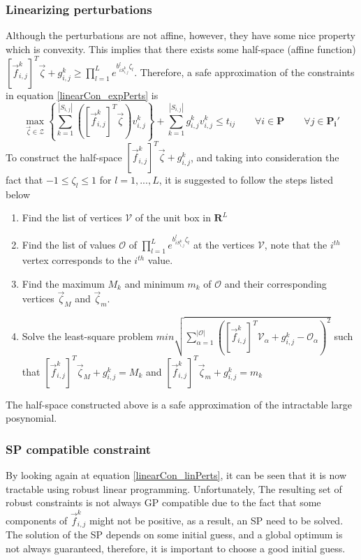 \subsubsection{Linearizing perturbations}
Although the perturbations are not affine, however, they have some nice property which is convexity. This implies that there exists some half-space (affine function) $[\vec{f}_{i,j}^k]^T\vec{\zeta} + g_{i,j}^k \geq \textstyle{\prod}_{l=1}^{L}e^{b^l_{iS_{i,j}^k}\zeta_l}$. Therefore, a safe approximation of the constraints in equation \eqref{linearCon_expPerts} is
\begin{equation}
\max_{\vec{\zeta} \in \mathcal{Z}} \left\{\textstyle{\sum}_{k=1}^{|S_{i,j}|}\left([\vec{f}_{i,j}^k]^T\vec{\zeta}\right)v_{i,j}^k \right\} + \textstyle{\sum}_{k=1}^{|S_{i,j}|}g_{i,j}^k v_{i,j}^k \leq t_{ij} \qquad \forall i \in \mathbf{P} \qquad \forall j \in \mathbf{P_i'}
\label{linearCon_linPerts}
\end{equation}
To construct the half-space $[\vec{f}_{i,j}^k]^T\vec{\zeta} + g_{i,j}^k$, and taking into consideration the fact that $-1 \leq \zeta_l \leq 1$ for $l = 1,...,L$, it is suggested to follow the steps listed below
\begin{enumerate}
\item Find the list of vertices $\mathcal{V}$ of the unit box in $\mathbf{R}^L$
\item Find the list of values $\mathcal{O}$ of $\textstyle{\prod}_{l=1}^{L}e^{b^l_{iS_{i,j}^k}\zeta_l}$ at the vertices $\mathcal{V}$, note that the $i^{th}$ vertex corresponds to the $i^{th}$ value.
\item Find the maximum $M_k$ and minimum $m_k$ of $\mathcal{O}$ and their corresponding vertices $\vec{\zeta}_M$ and $\vec{\zeta}_m$.
\item Solve the least-square problem $min \sqrt{\textstyle{\sum}_{\alpha=1}^{|\mathcal{O}|}([\vec{f}_{i,j}^k]^T\mathcal{V}_{\alpha} + g_{i,j}^k - \mathcal{O}_{\alpha})^2}$ such that $[\vec{f}_{i,j}^k]^T\vec{\zeta}_M + g_{i,j}^k = M_k$ and $[\vec{f}_{i,j}^k]^T\vec{\zeta}_m + g_{i,j}^k = m_k$
\end{enumerate}
The half-space constructed above is a safe approximation of the intractable large posynomial.

\subsubsection{SP compatible constraint}
By looking again at equation \eqref{linearCon_linPerts}, it can be seen that it is now tractable using robust linear programming. Unfortunately, The resulting set of robust constraints is not always GP compatible due to the fact that some components of $\vec{f}_{i,j}^k$ might not be positive, as a result, an SP need to be solved.\\
The solution of the SP depends on some initial guess, and a global optimum is not always guaranteed, therefore, it is important to choose a good initial guess.\\


